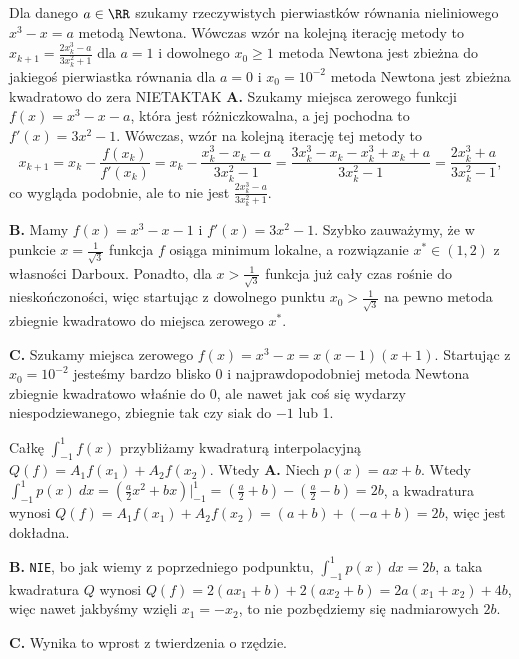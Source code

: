 \begin{solutions}
    \sol Dla danego $a \in \RR$ szukamy rzeczywistych pierwiastków równania nieliniowego $x^3 - x = a$ metodą Newtona. Wówczas
    \answerss
    {wzór na kolejną iterację metody to $x_{k+1} = \frac{2x^3_k-a}{3x^2_k+1}$}
    {dla $a = 1$ i dowolnego $x_0 \geq 1$ metoda Newtona jest zbieżna do jakiegoś pierwiastka równania}
    {dla $a = 0$ i $x_0 = 10^{-2}$ metoda Newtona jest zbieżna kwadratowo do zera}
    {NIE}{TAK}{TAK}
    \textbf{A.} Szukamy miejsca zerowego funkcji $f(x)=x^3-x-a$, która jest różniczkowalna, a jej pochodna to $f'(x)=3x^2-1$. Wówczas, wzór na kolejną iterację tej metody to
    $$
    x_{k+1} = x_k - \frac{f(x_k)}{f'(x_k)} = x_k - \frac{x_k^3-x_k-a}{3x_k^2-1} = \frac{3x_k^3-x_k-x_k^3+x_k+a}{3x_k^2-1} = \frac{2x_k^3+a}{3x_k^2-1},
    $$
    co wygląda podobnie, ale to nie jest $\frac{2x_k^3-a}{3x_k^2+1}$.

    \textbf{B.} Mamy $f(x)=x^3-x-1$ i $f'(x)=3x^2-1$. Szybko zauważymy, że w punkcie $x=\frac{1}{\sqrt{3}}$ funkcja $f$ osiąga minimum lokalne, a rozwiązanie $x^*\in(1,2)$ z własności Darboux. Ponadto, dla $x>\frac{1}{\sqrt{3}}$ funkcja już cały czas rośnie do nieskończoności, więc startując z dowolnego punktu $x_0>\frac{1}{\sqrt{3}}$ na pewno metoda zbiegnie kwadratowo do miejsca zerowego $x^*$.

    \textbf{C.} Szukamy miejsca zerowego $f(x)=x^3-x=x(x-1)(x+1)$. Startując z $x_0=10^{-2}$ jesteśmy bardzo blisko 0 i najprawdopodobniej metoda Newtona zbiegnie kwadratowo właśnie do 0, ale nawet jak coś się wydarzy niespodziewanego, zbiegnie tak czy siak do $-1$ lub 1.

    \sol Całkę $\int_{-1}^{1} f(x)$ przybliżamy kwadraturą interpolacyjną $Q(f) = A_1f(x_1)+A_2f(x_2)$. Wtedy
    \textbf{A.} Niech $p(x)=ax+b$. Wtedy $\int_{-1}^1 p(x)\ dx=(\frac{a}{2}x^2+bx)\big|_{-1}^1=(\frac{a}{2}+b)-(\frac{a}{2}-b)=2b$, a kwadratura wynosi $Q(f)=A_1f(x_1)+A_2f(x_2)=(a+b)+(-a+b)=2b$, więc jest dokładna.

    \textbf{B.} \texttt{NIE}, bo jak wiemy z poprzedniego podpunktu, $\int_{-1}^1p(x)\ dx=2b$, a taka kwadratura $Q$ wynosi $Q(f)=2(ax_1+b)+2(ax_2+b)=2a(x_1+x_2)+4b$, więc nawet jakbyśmy wzięli $x_1=-x_2$, to nie pozbędziemy się nadmiarowych $2b$.

    \textbf{C.} Wynika to wprost z twierdzenia o rzędzie.


\end{solutions}
